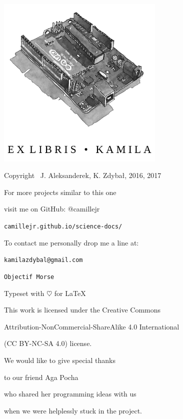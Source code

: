 \documentclass[10pt]{report}
\begin{document}

\thispagestyle{empty}
\begin{center}
    
\vspace*{4cm}

\includegraphics[width = 80mm]{ex_libris_arduino.png}

\vspace*{2cm}

Copyright \textcopyright \, J. Aleksanderek, K. Zdybał, 2016, 2017

For more projects similar to this one

visit me on GitHub: @camillejr

\verb|camillejr.github.io/science-docs/|

To contact me personally drop me a line at:

\verb|kamilazdybal@gmail.com|

\vspace*{2cm}

\verb|Objectif Morse|

Typeset with $\heartsuit$ for \LaTeX

\vspace*{1.8cm}

\noindent This work is licensed under the Creative Commons

Attribution-NonCommercial-ShareAlike 4.0 International 

(CC BY-NC-SA
4.0) license.

\end{center}
\newpage

\setlength{\parskip}{1em}
\renewcommand{\baselinestretch}{1.0}

\thispagestyle{empty}
\begin{center}
    
\vspace*{2.5cm}

{\selectfont
We would like to give special thanks

to our friend Aga Pocha

who shared her programming ideas with us

when we were helplessly stuck in the project.

}
\vspace*{2cm}

\end{center}
\end{document}
